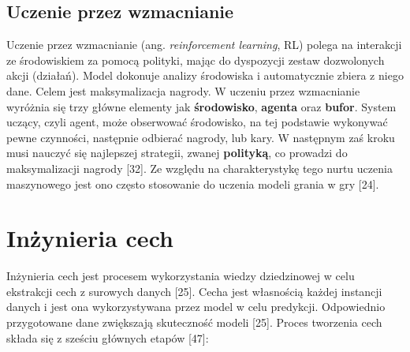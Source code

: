 \subsection{Uczenie przez wzmacnianie}
\label{cha:cha3.2.4}

Uczenie przez wzmacnianie (ang. \textit{reinforcement learning}, RL) polega na interakcji ze środowiskiem za pomocą polityki, mając do dyspozycji zestaw dozwolonych akcji (działań). Model dokonuje analizy środowiska i automatycznie zbiera z niego dane. Celem jest maksymalizacja nagrody. W uczeniu przez wzmacnianie wyróżnia się trzy główne elementy jak \textbf{środowisko}, \textbf{agenta} oraz \textbf{bufor}. System uczący, czyli agent, może obserwować środowisko, na tej podstawie wykonywać pewne czynności, następnie odbierać nagrody, lub kary. W następnym zaś kroku musi nauczyć się najlepszej strategii, zwanej \textbf{polityką}, co prowadzi do maksymalizacji nagrody [32]. Ze względu na charakterystykę tego nurtu uczenia maszynowego jest ono często stosowanie do uczenia modeli grania w gry [24].

\section{Inżynieria cech}
\label{cha:cha3.3}

Inżynieria cech jest procesem wykorzystania wiedzy dziedzinowej w celu ekstrakcji cech z surowych danych [25]. Cecha jest własnością każdej instancji danych i jest ona wykorzystywana przez model w celu predykcji. Odpowiednio przygotowane dane zwiększają skuteczność modeli [25]. Proces tworzenia cech składa się z sześciu głównych etapów [47]:

